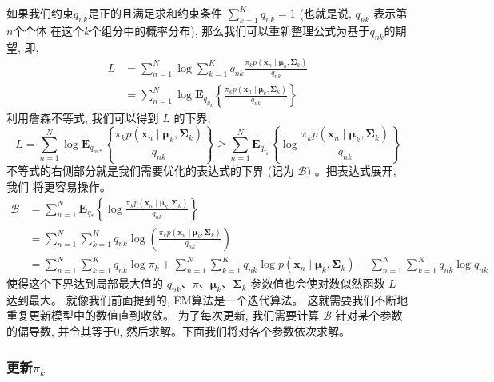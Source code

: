 \documentclass[UTF8]{ctexart}
\begin{document}
如果我们约束$q_{n k}$是正的且满足求和约束条件
$\sum_{k=1}^{K} q_{n k}=1$ 
(也就是说, $q_{nk}$ 表示第$n$个个体
在这个$k$个组分中的概率分布), 
那么我们可以重新整理公式为基于$q_{nk}$的期望, 即,
$$
\begin{aligned}
L &=\sum_{n=1}^{N} \log \sum_{k=1}^{K} q_{n k} \frac{\pi_{k} p\left(\boldsymbol{x}_{n} \mid \boldsymbol{\mu}_{k}, \boldsymbol{\Sigma}_{k}\right)}{q_{n k}} \\
&=\sum_{n=1}^{N} \log \boldsymbol{E}_{q_{\mu_{k}}}\left\{\frac{\pi_{k} p\left(\boldsymbol{x}_{n} \mid \boldsymbol{\mu}_{k}, \boldsymbol{\Sigma}_{k}\right)}{q_{n k}}\right\}
\end{aligned}
$$
利用詹森不等式, 我们可以得到 $L$ 的下界,
$$
L=\sum_{n=1}^{N} \log \boldsymbol{E}_{q_{m *}}\left\{\frac{\pi_{k} p\left(\boldsymbol{x}_{n} \mid \boldsymbol{\mu}_{k}, \boldsymbol{\Sigma}_{k}\right)}{q_{n k}}\right\} \geqslant \sum_{n=1}^{N} \boldsymbol{E}_{q_{\tau_{k}}}\left\{\log \frac{\pi_{k} p\left(\boldsymbol{x}_{n} \mid \boldsymbol{\mu}_{k}, \boldsymbol{\Sigma}_{k}\right)}{q_{n k}}\right\}
$$
不等式的右侧部分就是我们需要优化的表达式的下界 (记为 $\mathcal{B})$ 。把表达式展开, 我们 将更容易操作。
$$
\begin{aligned}
\mathcal{B} &=\sum_{n=1}^{N} \boldsymbol{E}_{q_{*}}\left\{\log \frac{\pi_{k} p\left(\boldsymbol{x}_{n} \mid \boldsymbol{\mu}_{k}, \boldsymbol{\Sigma}_{k}\right)}{q_{n k}}\right\} \\
&=\sum_{n=1}^{N} \sum_{k=1}^{K} q_{n k} \log \left(\frac{\pi_{k} p\left(\boldsymbol{x}_{n} \mid \boldsymbol{\mu}_{k}, \boldsymbol{\Sigma}_{k}\right)}{q_{n k}}\right) \\
&=\sum_{n=1}^{N} \sum_{k=1}^{K} q_{n k} \log \pi_{k}+\sum_{n=1}^{N} \sum_{k=1}^{K} q_{n k} \log p\left(\boldsymbol{x}_{n} \mid \boldsymbol{\mu}_{k}, \boldsymbol{\Sigma}_{k}\right)-\sum_{n=1}^{N} \sum_{k=1}^{K} q_{n k} \log q_{n k}
\end{aligned}
$$
使得这个下界达到局部最大值的 $q_{n k} 、 \pi 、 \boldsymbol{\mu}_{k} 、 \boldsymbol{\Sigma}_{k}$ 参数值也会使对数似然函数 $L$ 达到最大。
就像我们前面提到的, EM算法是一个迭代算法。
这就需要我们不断地重复更新模型中的数值直到收敛。
为了每次更新, 我们需要计算 $\mathcal{B}$ 针对某个参数的偏导数, 
并令其等于0, 然后求解。下面我们将对各个参数依次求解。

\subsubsection{更新$\pi_k$}
\end{document}
